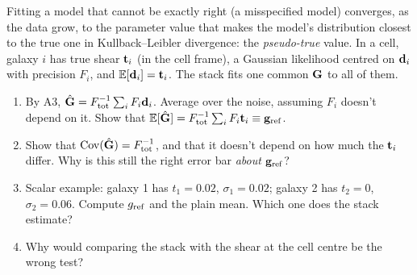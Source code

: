 

\begin{given}
Fitting a model that cannot be exactly right (a misspecified model) converges, as the data grow, to the parameter
value that makes the model's distribution closest to the true one in Kullback--Leibler divergence: the
\emph{pseudo-true} value.
In a cell, galaxy $i$ has true shear $\mathbf{t}_i$ (in the cell frame), a Gaussian likelihood centred on $\mathbf{d}_i$ with
precision $F_i$, and $\mathbb{E}[\mathbf{d}_i] = \mathbf{t}_i$. The stack fits one common $\mathbf{G}$ to all of them.
\end{given}


\begin{enumerate}
  \item By A3, $\hat{\mathbf{G}} = F_{\rm tot}^{-1}\sum_i F_i\mathbf{d}_i$. Average over the noise, assuming $F_i$ doesn't depend on it.
    Show that $\mathbb{E}[\hat{\mathbf{G}}] = F_{\rm tot}^{-1}\sum_i F_i\mathbf{t}_i \equiv \mathbf{g}_{\rm ref}$.
  \item Show that $\mathrm{Cov}(\hat{\mathbf{G}}) = F_{\rm tot}^{-1}$, and that it doesn't depend on how much the $\mathbf{t}_i$ differ.
    Why is this still the right error bar \emph{about} $\mathbf{g}_{\rm ref}$?
  \item Scalar example: galaxy 1 has $t_1 = 0.02$, $\sigma_1 = 0.02$; galaxy 2 has $t_2 = 0$, $\sigma_2 = 0.06$.
    Compute $g_{\rm ref}$ and the plain mean. Which one does the stack estimate?
  \item Why would comparing the stack with the shear at the cell centre be the wrong test?
\end{enumerate}

